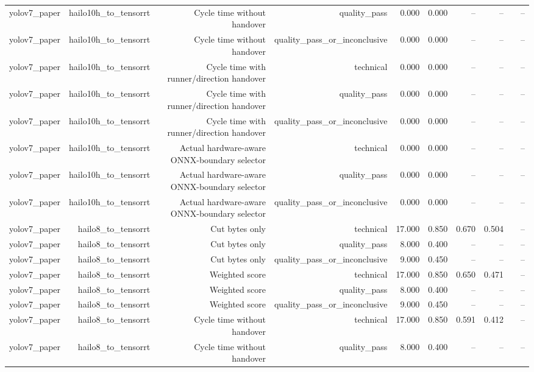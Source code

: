 \begin{table}[t]
\begin{tabular}{lrrrrrrrrr}
yolov7\_paper & hailo10h\_to\_tensorrt & Cycle time without handover & quality\_pass & 0.000 & 0.000 & -- & -- &  & -- \\
yolov7\_paper & hailo10h\_to\_tensorrt & Cycle time without handover & quality\_pass\_or\_inconclusive & 0.000 & 0.000 & -- & -- &  & -- \\
yolov7\_paper & hailo10h\_to\_tensorrt & Cycle time with runner/direction handover & technical & 0.000 & 0.000 & -- & -- &  & -- \\
yolov7\_paper & hailo10h\_to\_tensorrt & Cycle time with runner/direction handover & quality\_pass & 0.000 & 0.000 & -- & -- &  & -- \\
yolov7\_paper & hailo10h\_to\_tensorrt & Cycle time with runner/direction handover & quality\_pass\_or\_inconclusive & 0.000 & 0.000 & -- & -- &  & -- \\
yolov7\_paper & hailo10h\_to\_tensorrt & Actual hardware-aware ONNX-boundary selector & technical & 0.000 & 0.000 & -- & -- &  & -- \\
yolov7\_paper & hailo10h\_to\_tensorrt & Actual hardware-aware ONNX-boundary selector & quality\_pass & 0.000 & 0.000 & -- & -- &  & -- \\
yolov7\_paper & hailo10h\_to\_tensorrt & Actual hardware-aware ONNX-boundary selector & quality\_pass\_or\_inconclusive & 0.000 & 0.000 & -- & -- &  & -- \\
yolov7\_paper & hailo8\_to\_tensorrt & Cut bytes only & technical & 17.000 & 0.850 & 0.670 & 0.504 &  & -- \\
yolov7\_paper & hailo8\_to\_tensorrt & Cut bytes only & quality\_pass & 8.000 & 0.400 & -- & -- &  & -- \\
yolov7\_paper & hailo8\_to\_tensorrt & Cut bytes only & quality\_pass\_or\_inconclusive & 9.000 & 0.450 & -- & -- &  & -- \\
yolov7\_paper & hailo8\_to\_tensorrt & Weighted score & technical & 17.000 & 0.850 & 0.650 & 0.471 &  & -- \\
yolov7\_paper & hailo8\_to\_tensorrt & Weighted score & quality\_pass & 8.000 & 0.400 & -- & -- &  & -- \\
yolov7\_paper & hailo8\_to\_tensorrt & Weighted score & quality\_pass\_or\_inconclusive & 9.000 & 0.450 & -- & -- &  & -- \\
yolov7\_paper & hailo8\_to\_tensorrt & Cycle time without handover & technical & 17.000 & 0.850 & 0.591 & 0.412 &  & -- \\
yolov7\_paper & hailo8\_to\_tensorrt & Cycle time without handover & quality\_pass & 8.000 & 0.400 & -- & -- &  & -- \\

\end{tabular}
\end{table}
